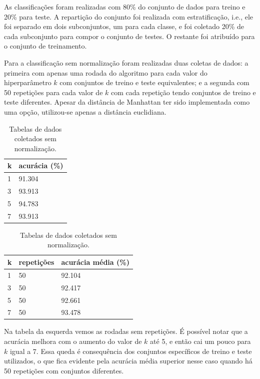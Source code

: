 \documentclass{article}
\begin{document}
As classificações foram realizadas com 80\% do conjunto de dados para treino e 20\% para teste. A repartição do conjunto foi realizada com estratificação, i.e., ele foi separado em dois subconjuntos, um para cada classe, e foi coletado 20\% de cada subconjunto para compor o conjunto de testes. O restante foi atribuído para o conjunto de treinamento.

Para a classificação sem normalização foram realizadas duas coletas de dados: a primeira com apenas uma rodada do algoritmo para cada valor do hiperparâmetro \(k\) com conjuntos de treino e teste equivalentes; e a segunda com 50 repetições para cada valor de \(k\) com cada repetição tendo conjuntos de treino e teste diferentes. Apesar da distância de Manhattan ter sido implementada como uma opção, utilizou-se apenas a distância euclidiana.

\bigskip
\begin{table}[h]
\begin{center}
    \begin{tabular}{ | m{2em} | m{10em} | }
    \hline
    k & acurácia (\%) \\
    \hline
    1 & 91.304 \\
    3 & 93.913 \\
    5 & 94.783 \\
    7 & 93.913 \\
    \hline
    \end{tabular}
    \hspace{20pt}%
    \begin{tabular}{ | m{2em} | m{5em} | m{10em} | }
    \hline
    k & repetições & acurácia média (\%) \\
    \hline
    1 & 50 & 92.104 \\
    3 & 50 & 92.417 \\
    5 & 50 & 92.661 \\
    7 & 50 & 93.478 \\
    \hline
    \end{tabular}
\caption{Tabelas de dados coletados sem normalização.}
\end{center}
\end{table}

Na tabela da esquerda vemos as rodadas sem repetições. É possível notar que a acurácia melhora com o aumento do valor de \(k\) até 5, e então cai um pouco para \(k\) igual a 7. Essa queda é consequência dos conjuntos específicos de treino e teste utilizados, o que fica evidente pela acurácia média superior nesse caso quando há 50 repetições com conjuntos diferentes.
\end{document}
